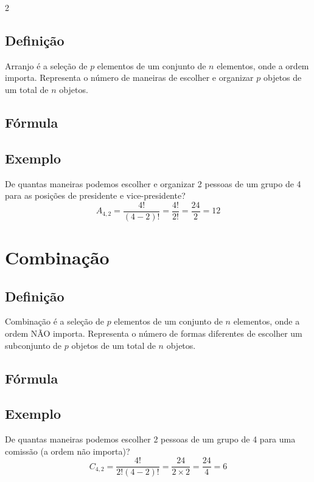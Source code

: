 \documentclass[11pt]{article}
\begin{document}
\begin{multicols}{2}
\subsection*{Definição}
Arranjo é a seleção de $p$ elementos de um conjunto de $n$ elementos, onde a ordem importa. Representa o número de maneiras de escolher e organizar $p$ objetos de um total de $n$ objetos.

\subsection*{Fórmula}

\subsection*{Exemplo}
De quantas maneiras podemos escolher e organizar 2 pessoas de um grupo de 4 para as posições de presidente e vice-presidente?
\[
A_{4,2} = \frac{4!}{(4-2)!} = \frac{4!}{2!} = \frac{24}{2} = 12
\]

\section*{Combinação}

\subsection*{Definição}
Combinação é a seleção de $p$ elementos de um conjunto de $n$ elementos, onde a ordem NÃO importa. Representa o número de formas diferentes de escolher um subconjunto de $p$ objetos de um total de $n$ objetos.

\subsection*{Fórmula}

\subsection*{Exemplo}
De quantas maneiras podemos escolher 2 pessoas de um grupo de 4 para uma comissão (a ordem não importa)?
\[
C_{4,2} = \frac{4!}{2!(4-2)!} = \frac{24}{2 \times 2} = \frac{24}{4} = 6
\]


\end{multicols}
\end{document}
